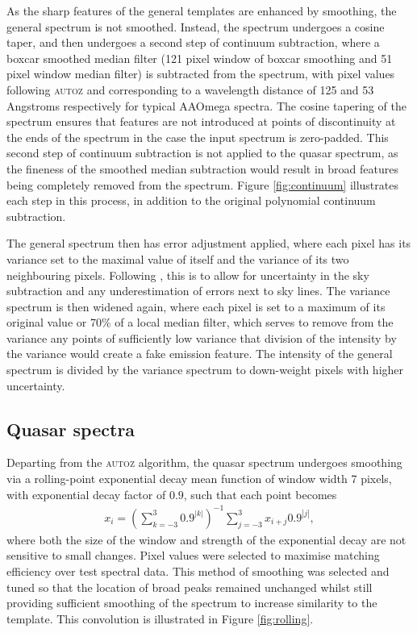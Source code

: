 \documentclass[5p]{elsarticle}
\newcommand{\autoz}{\textsc{autoz}}
\begin{document}
As the sharp features of the general templates are enhanced by smoothing, the general spectrum is not smoothed. Instead, the spectrum undergoes a cosine taper, and then undergoes a second step of continuum subtraction, where a boxcar smoothed median filter (121 pixel window of boxcar smoothing and 51 pixel window median filter) is subtracted from the spectrum, with pixel values following \autoz{} and corresponding to a wavelength distance of 125 and 53 Angstroms respectively for typical AAOmega spectra. The cosine tapering of the spectrum ensures that features are not introduced at points of discontinuity at the ends of the spectrum in the case the input spectrum is zero-padded.  This second step of continuum subtraction is not applied to the quasar spectrum, as the fineness of the smoothed median subtraction would result in broad features being completely removed from the spectrum. Figure \ref{fig:continuum} illustrates each step in this process, in addition to the original polynomial continuum subtraction.

The general spectrum then has error adjustment applied, where each pixel has its variance set to the maximal value of itself and the variance of its two neighbouring pixels. Following \citet{baldry2014galaxy}, this is to allow for uncertainty in the sky subtraction and any underestimation of errors next to sky lines. The variance spectrum is then widened again, where each pixel is set to a maximum of its original value or 70\% of a local median filter, which serves to remove from the variance any points of sufficiently low variance that division of the intensity by the variance would create a fake emission feature.  The intensity of the general spectrum is divided by the variance spectrum to down-weight pixels with higher uncertainty. 

\subsection{Quasar spectra}




Departing from the \autoz{} algorithm, the quasar spectrum undergoes smoothing via a rolling-point exponential decay mean function of window width 7 pixels, with exponential decay factor of $0.9$, such that each point becomes
\begin{align}
x_i = \left( \sum_{k = -3}^3 0.9^{|k|}   \right)^{-1} \sum_{j = -3}^3 x_{i+j} 0.9^{|j|},
\end{align}
where both the size of the window and strength of the exponential decay are not sensitive to small changes. Pixel values were selected to maximise matching efficiency over test spectral data. This method of smoothing was selected and tuned so that the location of broad peaks remained unchanged whilst still providing sufficient smoothing of the spectrum to increase similarity to the template. This convolution is illustrated in Figure \ref{fig:rolling}.
\end{document}

